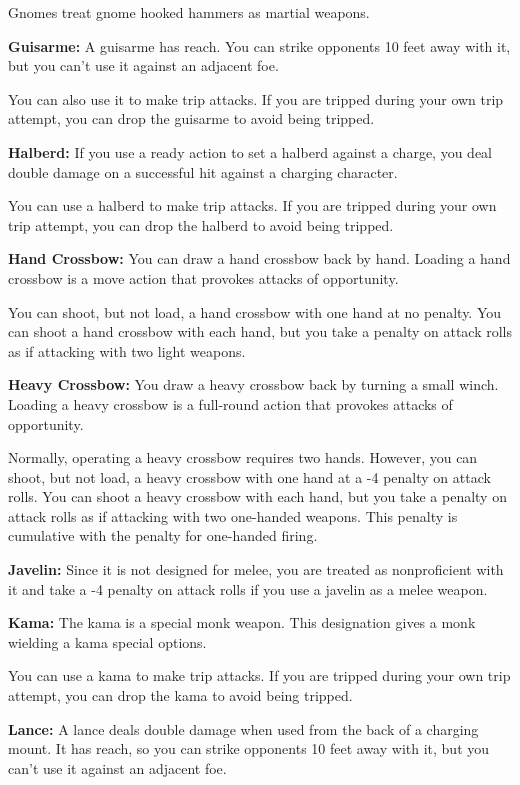 Gnomes treat gnome hooked hammers as martial weapons.

\textbf{Guisarme:} A guisarme has reach. You can strike opponents 10 feet away 
with it, but you can't use it against an adjacent foe.

You can also use it to make trip attacks. If you are tripped during your own trip 
attempt, you can drop the guisarme to avoid being tripped.

\textbf{Halberd:} If you use a ready action to set a halberd against a charge, 
you deal double damage on a successful hit against a charging character.

You can use a halberd to make trip attacks. If you are tripped during your own 
trip attempt, you can drop the halberd to avoid being tripped.

\textbf{Hand Crossbow:} You can draw a hand crossbow back by hand. Loading a hand 
crossbow is a move action that provokes attacks of opportunity.

You can shoot, but not load, a hand crossbow with one hand at no penalty. You can 
shoot a hand crossbow with each hand, but you take a penalty on attack rolls as 
if attacking with two light weapons.

\textbf{Heavy Crossbow:} You draw a heavy crossbow back by turning a small winch. 
Loading a heavy crossbow is a full-round action that provokes attacks of opportunity.

Normally, operating a heavy crossbow requires two hands. However, you can shoot, 
but not load, a heavy crossbow with one hand at a -4 penalty on attack rolls. You 
can shoot a heavy crossbow with each hand, but you take a penalty on attack rolls 
as if attacking with two one-handed weapons. This penalty is cumulative with the 
penalty for one-handed firing.

\textbf{Javelin:} Since it is not designed for melee, you are treated as nonproficient 
with it and take a -4 penalty on attack rolls if you use a javelin as a melee weapon.

\textbf{Kama:} The kama is a special monk weapon. This designation gives a monk 
wielding a kama special options.

You can use a kama to make trip attacks. If you are tripped during your own trip 
attempt, you can drop the kama to avoid being tripped.

\textbf{Lance:} A lance deals double damage when used from the back of a charging 
mount. It has reach, so you can strike opponents 10 feet away with it, but you 
can't use it against an adjacent foe.

